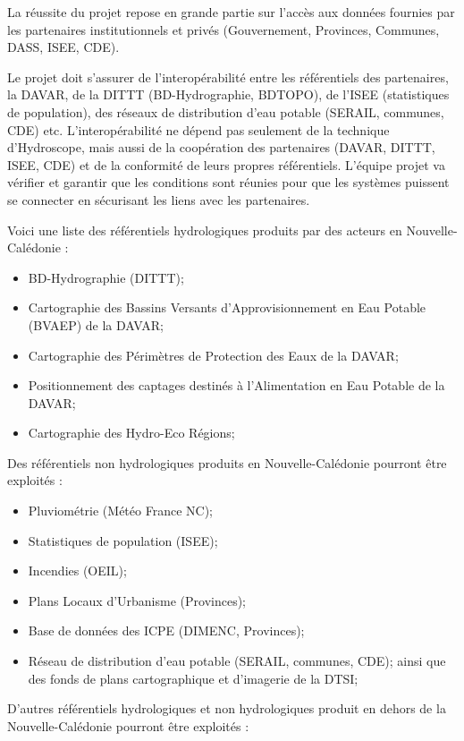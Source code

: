 \documentclass[
  french,
  11pt,
]{article}
\providecommand{\tightlist}{%
  \setlength{\itemsep}{0pt}\setlength{\parskip}{0pt}}
\begin{document}
La réussite du projet repose en grande partie sur l'accès aux données
fournies par les partenaires institutionnels et privés (Gouvernement,
Provinces, Communes, DASS, ISEE, CDE).

Le projet doit s'assurer de l'interopérabilité entre les référentiels
des partenaires, la DAVAR, de la DITTT (BD-Hydrographie, BDTOPO), de
l'ISEE (statistiques de population), des réseaux de distribution d'eau
potable (SERAIL, communes, CDE) etc. L'interopérabilité ne dépend pas
seulement de la technique d'Hydroscope, mais aussi de la coopération des
partenaires (DAVAR, DITTT, ISEE, CDE) et de la conformité de leurs
propres référentiels. L'équipe projet va vérifier et garantir que les
conditions sont réunies pour que les systèmes puissent se connecter en
sécurisant les liens avec les partenaires.

Voici une liste des référentiels hydrologiques produits par des acteurs
en Nouvelle-Calédonie :

\begin{itemize}
\tightlist
\item
  BD-Hydrographie (DITTT);
\item
  Cartographie des Bassins Versants d'Approvisionnement en Eau Potable
  (BVAEP) de la DAVAR;
\item
  Cartographie des Périmètres de Protection des Eaux de la DAVAR;
\item
  Positionnement des captages destinés à l'Alimentation en Eau Potable
  de la DAVAR;
\item
  Cartographie des Hydro-Eco Régions;
\end{itemize}

Des référentiels non hydrologiques produits en Nouvelle-Calédonie
pourront être exploités :

\begin{itemize}
\tightlist
\item
  Pluviométrie (Météo France NC);
\item
  Statistiques de population (ISEE);
\item
  Incendies (OEIL);
\item
  Plans Locaux d'Urbanisme (Provinces);
\item
  Base de données des ICPE (DIMENC, Provinces);
\item
  Réseau de distribution d'eau potable (SERAIL, communes, CDE); ainsi
  que des fonds de plans cartographique et d'imagerie de la DTSI;
\end{itemize}

D'autres référentiels hydrologiques et non hydrologiques produit en
dehors de la Nouvelle-Calédonie pourront être exploités :
\end{document}
